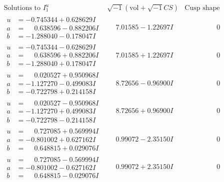 \documentclass[1p]{elsarticle_modified}
\theoremstyle{definition}
\newcommand{\I}{\sqrt{-1}}
\begin{document}
$$\begin{array}{c|c|c}  
\text{Solutions to }I^u_{1}& \I (\text{vol} + \sqrt{-1}CS) & \text{Cusp shape}\\
 \hline 
\begin{aligned}
u &= -0.745344 + 0.628629 I \\
a &= \phantom{-}0.638596 - 0.882206 I \\
b &= -1.288040 - 0.178047 I\end{aligned}
 & \phantom{-}7.01585 - 1.22697 I & \phantom{-0.000000 } 0 \\ \hline\begin{aligned}
u &= -0.745344 - 0.628629 I \\
a &= \phantom{-}0.638596 + 0.882206 I \\
b &= -1.288040 + 0.178047 I\end{aligned}
 & \phantom{-}7.01585 + 1.22697 I & \phantom{-0.000000 } 0 \\ \hline\begin{aligned}
u &= \phantom{-}0.020527 + 0.950968 I \\
a &= -1.127270 - 0.499083 I \\
b &= -0.722798 + 0.214158 I\end{aligned}
 & \phantom{-}8.72656 - 0.96900 I & \phantom{-0.000000 } 0 \\ \hline\begin{aligned}
u &= \phantom{-}0.020527 - 0.950968 I \\
a &= -1.127270 + 0.499083 I \\
b &= -0.722798 - 0.214158 I\end{aligned}
 & \phantom{-}8.72656 + 0.96900 I & \phantom{-0.000000 } 0 \\ \hline\begin{aligned}
u &= \phantom{-}0.727085 + 0.569994 I \\
a &= -0.801002 + 0.627162 I \\
b &= \phantom{-}0.648815 + 0.029076 I\end{aligned}
 & \phantom{-}0.99072 - 2.35150 I & \phantom{-0.000000 } 0 \\ \hline\begin{aligned}
u &= \phantom{-}0.727085 - 0.569994 I \\
a &= -0.801002 - 0.627162 I \\
b &= \phantom{-}0.648815 - 0.029076 I\end{aligned}
 & \phantom{-}0.99072 + 2.35150 I & \phantom{-0.000000 } 0 \\ \hline\begin{aligned}

\end{aligned}
\end{array}$$
\end{document}
